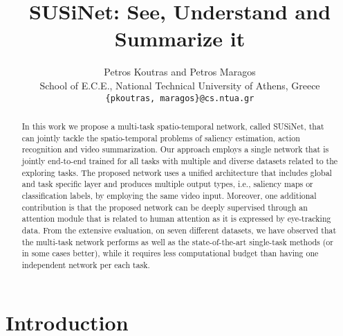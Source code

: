\documentclass[10pt,twocolumn,letterpaper]{article}
\begin{document}
\title{SUSiNet: See, Understand and Summarize it}


\author{Petros Koutras \quad and \quad Petros Maragos \\
School of E.C.E., National Technical University of Athens, Greece\\
{\tt\small \{pkoutras, maragos\}@cs.ntua.gr}
}



\maketitle


\begin{abstract}
In this work we propose a multi-task spatio-temporal network, called SUSiNet, that can jointly tackle the spatio-temporal problems of saliency estimation, action recognition and video summarization. Our approach employs a single network that is jointly end-to-end trained for all tasks with multiple and diverse datasets related to the exploring tasks. The proposed network uses a unified architecture that includes global and task specific layer and produces multiple output types, i.e., saliency maps or classification labels, by employing the same video input. Moreover, one additional contribution is that the proposed network can be deeply supervised through an attention module that is related to human attention as it is expressed by eye-tracking data. From the extensive evaluation, on seven different datasets, we have observed that the multi-task network performs as well as the state-of-the-art single-task methods (or in some cases better), while it requires less computational budget than having one independent network per each task.
\end{abstract}

\vspace{-0.30cm}
\section{Introduction}
\end{document}
